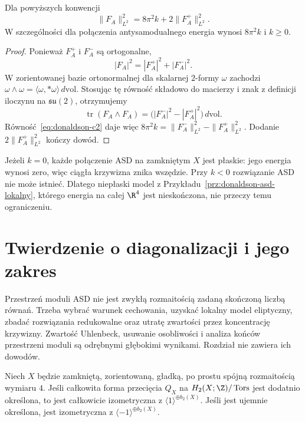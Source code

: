 \begin{stwierdzenie}
\label{prop:donaldson-energy}
Dla powyższych konwencji
\[
 \|F_A\|_{L^2}^2
 =8\pi^2k+2\|F_A^+\|_{L^2}^2.
\]
W szczególności dla połączenia antysamodualnego
energia wynosi $8\pi^2k$ i $k\geq0$.
\end{stwierdzenie}
\begin{proof}
Ponieważ $F_A^+$ i $F_A^-$ są ortogonalne,
\[
 |F_A|^2=|F_A^+|^2+|F_A^-|^2.
\]
W zorientowanej bazie ortonormalnej dla skalarnej
$2$-formy $\omega$ zachodzi
$\omega\wedge\omega=\langle\omega,*\omega\rangle
\,d\mathrm{vol}$. Stosując tę równość składowo
do macierzy i znak z definicji iloczynu na
$\mathfrak{su}(2)$, otrzymujemy
\[
 \operatorname{tr}(F_A\wedge F_A)
 =\bigl(|F_A^-|^2-|F_A^+|^2\bigr)
   \,d\mathrm{vol}.
\]
Równość~\eqref{eq:donaldson-c2} daje więc
$8\pi^2k=\|F_A^-\|_{L^2}^2-\|F_A^+\|_{L^2}^2$.
Dodanie $2\|F_A^+\|_{L^2}^2$ kończy dowód.
\end{proof}

Jeżeli $k=0$, każde połączenie ASD na zamkniętym
$X$ jest płaskie: jego energia wynosi zero, więc
ciągła krzywizna znika wszędzie. Przy $k<0$
rozwiązanie ASD nie może istnieć. Dlatego
niepłaski model z
Przykładu~\ref{prz:donaldson-asd-lokalny},
którego energia na całej $\R^4$ jest nieskończona,
nie przeczy temu ograniczeniu.

\section{Twierdzenie o diagonalizacji i jego zakres}
\label{sec:donaldson-diagonalizacja}

Przestrzeń moduli ASD nie jest zwykłą rozmaitością
zadaną skończoną liczbą równań. Trzeba wybrać
warunek cechowania, uzyskać lokalny model eliptyczny,
zbadać rozwiązania redukowalne oraz utratę zwartości
przez koncentrację krzywizny. Zwartość Uhlenbeck,
usuwanie osobliwości i analiza końców przestrzeni moduli
są odrębnymi głębokimi wynikami. Rozdział nie zawiera
ich dowodów.

\begin{twierdzenie}
\label{thm:donaldson-diagonalizacja}
Niech $X$ będzie zamkniętą, zorientowaną, gładką,
po prostu spójną rozmaitością wymiaru $4$.
Jeśli całkowita forma przecięcia $Q_X$ na
$H_2(X;\Z)/\operatorname{Tors}$ jest dodatnio określona,
to jest całkowicie izometryczna z
$\langle1\rangle^{\oplus b_2(X)}$.
Jeśli jest ujemnie określona, jest izometryczna z
$\langle-1\rangle^{\oplus b_2(X)}$.
\end{twierdzenie}

